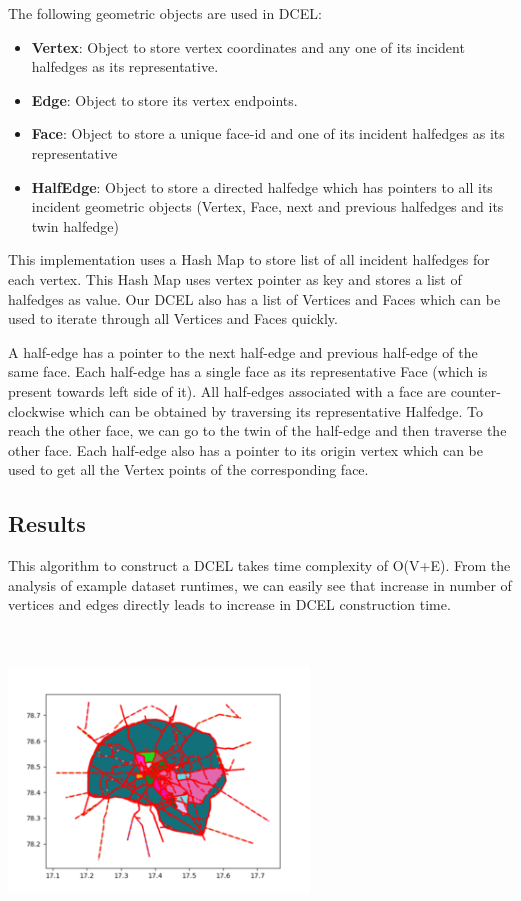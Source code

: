 The following geometric objects are used in DCEL:

\begin{itemize}
\tightlist
\item
  \textbf{Vertex}: Object to store vertex coordinates and any one of its
  incident halfedges as its representative.
\item
  \textbf{Edge}: Object to store its vertex endpoints.
\item
  \textbf{Face}: Object to store a unique face-id and one of its
  incident halfedges as its representative
\item
  \textbf{HalfEdge}: Object to store a directed halfedge which has
  pointers to all its incident geometric objects (Vertex, Face, next and
  previous halfedges and its twin halfedge)
\end{itemize}

This implementation uses a Hash Map to store list of all incident
halfedges for each vertex. This Hash Map uses vertex pointer as key and
stores a list of halfedges as value. Our DCEL also has a list of
Vertices and Faces which can be used to iterate through all Vertices and
Faces quickly.

A half-edge has a pointer to the next half-edge and previous half-edge
of the same face. Each half-edge has a single face as its representative
Face (which is present towards left side of it). All half-edges
associated with a face are counter-clockwise which can be obtained by
traversing its representative Halfedge. To reach the other face, we can
go to the twin of the half-edge and then traverse the other face. Each
half-edge also has a pointer to its origin vertex which can be used to
get all the Vertex points of the corresponding face.

\hypertarget{results}{%
\subsection{Results}\label{results}}

This algorithm to construct a DCEL takes time complexity of O(V+E). From
the analysis of example dataset runtimes, we can easily see that
increase in number of vertices and edges directly leads to increase in
DCEL construction time.

\includegraphics[width=8cm,height=8cm]{img/DCELhyd4.png}\\

